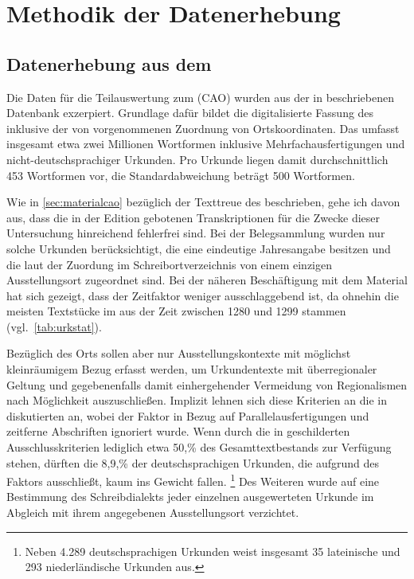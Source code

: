 \chapter{Methodik der Datenerhebung}
\label{ch:methoden}

\section%
	{Datenerhebung aus dem }
\label{sec:miningcao}

Die Daten für die Teilauswertung zum  (CAO) wurden aus der in
\textcites[207]{beckerschallert2021}[155--158]{beckerschallert2022b}
beschriebenen Datenbank exzerpiert. Grundlage dafür bildet die digitalisierte
Fassung des \CAO{}
\autocites{cao-online}[vgl.~dazu][]{gniffkerapp2005} inklusive der von
\citeauthor{beckerschallert2022b} vorgenommenen Zuordnung von Ortskoordinaten.
Das \CAO{} umfasst insgesamt etwa zwei Millionen Wortformen inklusive
Mehrfachausfertigungen und nicht-deutschsprachiger Urkunden. Pro Urkunde liegen
damit durchschnittlich 453 Wortformen vor, die Standardabweichung beträgt 500
Wortformen.

Wie in \cref{sec:materialcao} bezüglich der Text\-treue des \CAO{}
beschrieben, gehe ich davon aus, dass die in der Edition gebotenen
Transkriptionen für die Zwecke dieser Untersuchung hinreichend fehlerfrei sind.
Bei der Belegsammlung wurden nur solche Urkunden berücksichtigt, die eine
eindeutige Jahresangabe besitzen und die laut der Zuordung im
Schreibortverzeichnis von \citet{cao-online} einem einzigen Ausstellungsort
zugeordnet sind. Bei der näheren Beschäftigung mit dem Material hat sich gezeigt, dass der Zeitfaktor weniger ausschlaggebend ist, da
ohnehin die meisten Textstücke im \CAO{} aus der Zeit zwischen 1280
und 1299 stammen (vgl.~\cref{tab:urkstat}).

Bezüglich des Orts sollen aber nur Ausstellungs\-kontexte mit möglichst
kleinräumigem Bezug erfasst werden, um Urkundentexte mit überregionaler Geltung
und gegebenenfalls damit einhergehender Vermeidung von Regionalismen nach
Möglichkeit auszuschließen. Implizit lehnen sich diese Kriterien an die in
\citet[41--42]{ganslmayer2012} diskutierten an, wobei der Faktor  in
Bezug auf Parallelausfertigungen und zeitferne Abschriften ignoriert wurde.
Wenn durch die in \citet[155--158]{beckerschallert2022b} geschilderten
Ausschlusskriterien lediglich etwa 50,\% des Gesamttextbestands zur Verfügung
stehen, dürften die 8,9,\% der deutschsprachigen Urkunden, die
\citeauthor{ganslmayer2012} aufgrund des Faktors  ausschließt, kaum
ins Gewicht fallen.%
%
	\footnote{Neben 4.289 deutschsprachigen Urkunden weist
		\citet[41]{ganslmayer2012} insgesamt 35 lateinische und 293
		niederländische Urkunden aus.}
%
Des Weiteren wurde auf eine Bestimmung des Schreibdialekts jeder einzelnen
ausgewerteten Urkunde im Abgleich mit ihrem angegebenen Ausstellungsort
verzichtet.

